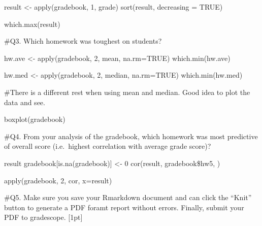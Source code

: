\documentclass[
]{article}
\begin{document}
result \textless- apply(gradebook, 1, grade) sort(result, decreasing =
TRUE)

which.max(result)

\#Q3. Which homework was toughest on students?

hw.ave \textless- apply(gradebook, 2, mean, na.rm=TRUE)
which.min(hw.ave)

hw.med \textless- apply(gradebook, 2, median, na.rm=TRUE)
which.min(hw.med)

\#There is a different rest when using mean and median. Good idea to
plot the data and see.

boxplot(gradebook)

\#Q4. From your analysis of the gradebook, which homework was most
predictive of overall score (i.e.~highest correlation with average grade
score)?

result gradebook{[}is.na(gradebook){]} \textless- 0 cor(result,
gradebook\$hw5, )

apply(gradebook, 2, cor, x=result)

\#Q5. Make sure you save your Rmarkdown document and can click the
``Knit'' button to generate a PDF foramt report without errors. Finally,
submit your PDF to gradescope. {[}1pt{]}
\end{document}

